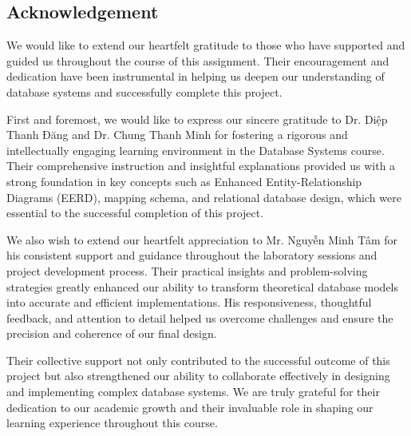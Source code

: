 \begin{center}
\section*{Acknowledgement}
\end{center}

We would like to extend our heartfelt gratitude to those who have supported and guided us throughout the course of this assignment. Their encouragement and dedication have been instrumental in helping us deepen our understanding of database systems and successfully complete this project.

First and foremost, we would like to express our sincere gratitude to Dr. Diệp Thanh Đăng and Dr. Chung Thanh Minh for fostering a rigorous and intellectually engaging learning environment in the Database Systems course. Their comprehensive instruction and insightful explanations provided us with a strong foundation in key concepts such as Enhanced Entity-Relationship Diagrams (EERD), mapping schema, and relational database design, which were essential to the successful completion of this project.

We also wish to extend our heartfelt appreciation to Mr. Nguyễn Minh Tâm for his consistent support and guidance throughout the laboratory sessions and project development process. Their practical insights and problem-solving strategies greatly enhanced our ability to transform theoretical database models into accurate and efficient implementations. His responsiveness, thoughtful feedback, and attention to detail helped us overcome challenges and ensure the precision and coherence of our final design.

Their collective support not only contributed to the successful outcome of this project but also strengthened our ability to collaborate effectively in designing and implementing complex database systems. We are truly grateful for their dedication to our academic growth and their invaluable role in shaping our learning experience throughout this course.
